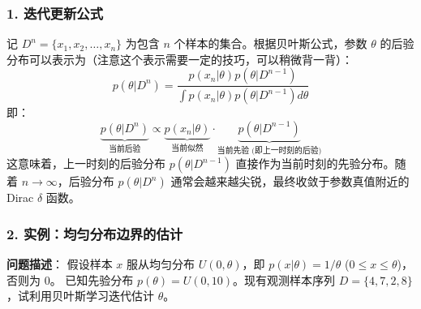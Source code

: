 \documentclass[a4paper, 11pt]{ctexart}
\begin{document}
\subsubsection{1. 迭代更新公式}
记 $D^n = \{x_1, x_2, \dots, x_n\}$ 为包含 $n$ 个样本的集合。根据贝叶斯公式，参数 $\theta$ 的后验分布可以表示为（注意这个表示需要一定的技巧，可以稍微背一背）：
\begin{equation}
    p(\theta|D^n) = \frac{p(x_n|\theta) p(\theta|D^{n-1})}{\int p(x_n|\theta) p(\theta|D^{n-1}) d\theta}
\end{equation}
即：
\begin{equation}
    \underbrace{p(\theta|D^n)}_{\text{当前后验}} \propto \underbrace{p(x_n|\theta)}_{\text{当前似然}} \cdot \underbrace{p(\theta|D^{n-1})}_{\text{当前先验 (即上一时刻的后验)}}
\end{equation}
这意味着，上一时刻的后验分布 $p(\theta|D^{n-1})$ 直接作为当前时刻的先验分布。随着 $n \to \infty$，后验分布 $p(\theta|D^n)$ 通常会越来越尖锐，最终收敛于参数真值附近的 Dirac $\delta$ 函数。

\subsubsection{2. 实例：均匀分布边界的估计}
\textbf{问题描述}：
假设样本 $x$ 服从均匀分布 $U(0, \theta)$，即 $p(x|\theta) = 1/\theta$ ($0 \le x \le \theta$)，否则为 0。
已知先验分布 $p(\theta) = U(0, 10)$。现有观测样本序列 $D = \{4, 7, 2, 8\}$，试利用贝叶斯学习迭代估计 $\theta$。
\end{document}
